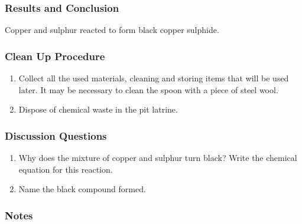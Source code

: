 \subsubsection*{Results and Conclusion}
Copper and sulphur reacted to form black copper sulphide.

\subsubsection*{Clean Up Procedure}
\begin{enumerate}
\item{Collect all the used materials, cleaning and storing items that will be used later. It may be necessary to clean the spoon with a piece of steel wool.}
\item{Dispose of chemical waste in the pit latrine.}
\end{enumerate}

\subsubsection*{Discussion Questions}
\begin{enumerate}
\item{Why does the mixture of copper and sulphur turn black? Write the chemical equation for this reaction.}
\item{Name the black compound formed.}
\end{enumerate}

\subsubsection*{Notes}



